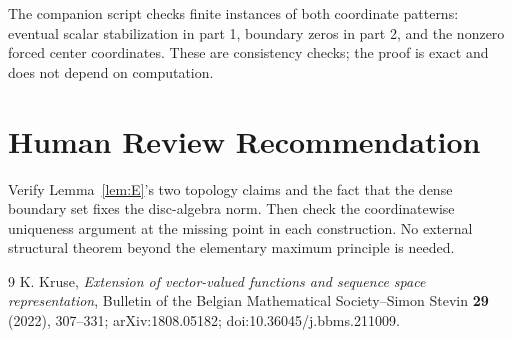 \documentclass[11pt]{article}
\begin{document}
The companion script checks finite instances of both coordinate patterns:
eventual scalar stabilization in part 1, boundary zeros in part 2, and the
nonzero forced center coordinates.  These are consistency checks; the proof
is exact and does not depend on computation.

\section*{Human Review Recommendation}

Verify Lemma~\ref{lem:E}'s two topology claims and the fact that the dense
boundary set fixes the disc-algebra norm.  Then check the coordinatewise
uniqueness argument at the missing point in each construction.  No external
structural theorem beyond the elementary maximum principle is needed.

\begin{thebibliography}{9}
\small
{}
K. Kruse,
\emph{Extension of vector-valued functions and sequence space
representation}, Bulletin of the Belgian Mathematical Society--Simon Stevin
\textbf{29} (2022), 307--331; arXiv:1808.05182;
doi:10.36045/j.bbms.211009.
\end{thebibliography}
\end{document}
